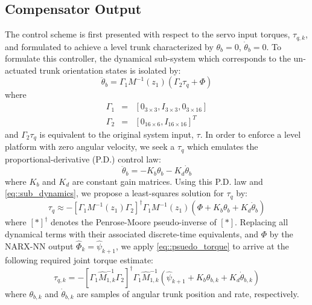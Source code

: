 		\subsection{Compensator Output}

			The control scheme is first presented with respect to the servo input torques, $\tau_{q,k}$, and formulated to achieve a level trunk characterized by $\theta_{b}=0$, $\dot{\theta}_{b}= 0$. To formulate this controller, the dynamical sub-system which corresponds to the un-actuated trunk orientation states is isolated by:
				\begin{equation}
					\ddot{\theta}_{b} 	= \Gamma_{1} M^{-1}(z_{1})( \Gamma_{2}\tau_{q}	 + \Phi)
					\label{eq::sub_dynamics}
				\end{equation}
			where 
				\begin{eqnarray*}
					\Gamma_{1} &=& [0_{3\times3},I_{3\times3},0_{3\times16}] \nonumber\\
					\Gamma_{2} &=& [0_{16\times6},I_{16\times16}]^{T}	
				\end{eqnarray*}
			and $\Gamma_{2}\tau_{q}$ is equivalent to the original system input, $\tau$. In order to enforce a level platform with zero angular velocity, we seek a $\tau_{q}$ which emulates the proportional-derivative (P.D.) control law:
				\begin{equation}
				 	\ddot{\theta}_{b} = - K_{b}{\theta}_{b} - K_{d}\dot{\theta}_{b}
				\end{equation}
			where $K_{b}$ and $K_{d}$ are constant gain matrices. Using this P.D. law and \ref{eq::sub_dynamics}, we propose a least-squares solution for $\tau_{q}$ by:
				\begin{equation}
					\tau_{q} \approx -\left[\Gamma_{1} M^{-1}(z_{1}) \Gamma_{2}\right]^{\dagger}\Gamma_{1} M^{-1}(z_{1})(\Phi + K_{b}{\theta}_{b} + K_{d}\dot{\theta}_{b} )
					\label{eq::psuedo_torque}
				\end{equation}
			where $\left[*\right]^{\dagger}$ denotes the Penrose-Moore pseudo-inverse of $[*]$.
			Replacing all dynamical terms with their associated discrete-time equivalents, and $\Phi$ by the NARX-NN output $\hat{\Phi}_{k}=\hat{\psi}_{k+1}$, we apply \ref{eq::psuedo_torque} to arrive at the following required joint torque estimate:
				\begin{equation}
					\hat{\tau}_{q,k} =  -\left[\Gamma_{1} \hat{M}^{-1}_{1,k} \Gamma_{2}\right]^{\dagger} \Gamma_{1}\hat{M}^{-1}_{1,k}( \hat{\psi}_{k+1} + K_{b}{\theta}_{b,k} + K_{d}\dot{\theta}_{b,k} )
					\label{eq::psuedo_torque_k}
				\end{equation}
			where ${\theta}_{b,k}$ and $\dot{\theta}_{b,k}$ are samples of angular trunk position and rate, respectively.


